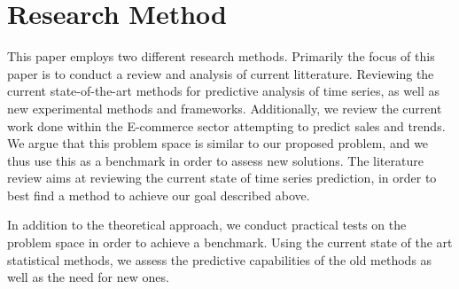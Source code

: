 \section{Research Method}
\label{section:Introduction:research-method}

This paper employs two different research methods.
Primarily the focus of this paper is to conduct a review and analysis of current litterature.
Reviewing the current state-of-the-art methods for predictive analysis of time series,
as well as new experimental methods and frameworks.
Additionally, we review the current work done within the E-commerce sector attempting to predict sales and trends.
We argue that this problem space is similar to our proposed problem, and we thus use this as a benchmark in order to assess new solutions.
The literature review aims at reviewing the current state of time series prediction,
in order to best find a method to achieve our goal described above.

In addition to the theoretical approach, we conduct practical tests on the problem space in order to achieve a benchmark.
Using the current state of the art statistical methods,
we assess the predictive capabilities of the old methods as well as the need for new ones.



\iffalse

What methodology will you apply to address the goals: theoretic/analytic, model/abstraction or design/experiment?
This section will describe the research methodology applied and the reason for this choice of research methodology.  

\fi
